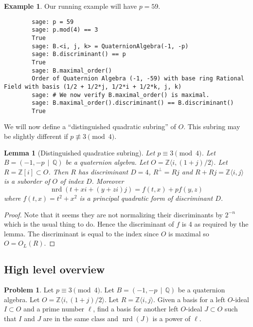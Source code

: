 \documentclass[10pt]{article}
\theoremstyle{plain}
\newtheorem{lemma}[theorem]{Lemma}
\theoremstyle{definition}
\newtheorem{example}[theorem]{Example}
\newtheorem{prob}[theorem]{Problem}
\newcommand{\op}{\operatorname}
\newcommand{\Z}{\mathbb{Z}}
\newcommand{\Q}{\mathbb{Q}}
\newcommand{\nrd}{\op{nrd}}
\begin{document}
\begin{example}
    Our running example will have \( p = 59 \).
    \begin{lstlisting}
        sage: p = 59
        sage: p.mod(4) == 3
        True 
        sage: B.<i, j, k> = QuaternionAlgebra(-1, -p)
        sage: B.discriminant() == p
        True
        sage: B.maximal_order()
        Order of Quaternion Algebra (-1, -59) with base ring Rational Field with basis (1/2 + 1/2*j, 1/2*i + 1/2*k, j, k)
        sage: # We now verify B.maximal_order() is maximal.
        sage: B.maximal_order().discriminant() == B.discriminant()
        True
    \end{lstlisting}
\end{example}

We will now define a ``distinguished quadratic subring'' of \( O \).
This subring may be slightly different if \( p \not\equiv 3 \pmod{4} \).

\begin{lemma}[Distinguished quadratice subring]
    Let \( p \equiv 3 \pmod{4} \).
    Let \( B =  (-1, -p \, \mid \, \Q) \) be a quaternion algebra.
    Let \( O = \Z \langle i, (1+j) / 2 \rangle \).
    Let \( R = \Z[i] \subset O \).
    Then \( R \) has discriminant \( D = 4 \), \( R^\perp = Rj \) and \( R + Rj = \Z\langle i, j \rangle\) is a suborder of \( O \) of index \( D \).
    Moreover
    \[
        \nrd(t + xi + (y + zi)j) = f(t, x) + p f(y, z)
    \]
    where \( f(t, x) = t^2 + x^2 \) is a principal quadratic form of discriminant \( D \).
\end{lemma}
\begin{proof}
    Note that it seems they are not normalizing their discriminants by \( 2^{-n} \) which is the usual thing to do.
    Hence the discriminant of \( f \) is 4 as required by the lemma.
    The discriminant is equal to the index since \( O \) is maximal so \( O = O_L(R) \).
\end{proof}

\subsection{High level overview}

\begin{prob}
    Let \( p \equiv 3 \pmod{4} \).
    Let \( B =  (-1, -p \, \mid \, \Q) \) be a quaternion algebra.
    Let \( O = \Z \langle i, (1+j) / 2 \rangle \).
    Let \( R = \Z \langle i , j \rangle \).
    Given a basis for a left \( O \)-ideal \( I \subset O \) and a prime number \( \ell \), find a basis for another left \( O \)-ideal \( J \subset O \) such that \( I \) and \( J \) are in the same class and \( \nrd(J) \) is a power of \( \ell \).
\end{prob}
\end{document}

